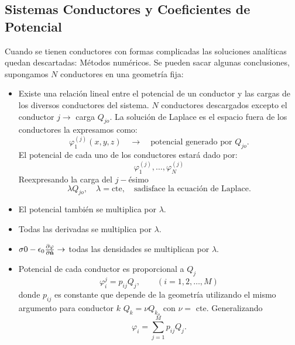 \subsection{Sistemas Conductores y Coeficientes de Potencial}
Cuando se tienen conductores con formas complicadas las soluciones analíticas quedan descartadas: Métodos numéricos. Se pueden sacar algunas conclusiones, supongamos $N$ conductores en una geometría fija:
\begin{itemize}
	\item Existe una relación lineal entre el potencial de un conductor y las cargas de los diversos conductores del sistema. $N$ conductores descargados excepto el conductor $j\to$ carga $Q_{jo}$. La solución de Laplace es el espacio fuera de los conductores la expresamos como:
	\begin{equation}
		\varphi _1 ^{(j)} (x,y,z) \quad \to \quad \text{potencial generado por } Q_{jo}.
	\end{equation}
	El potencial de cada uno de los conductores estará dado por:
	\begin{equation}
		\varphi _1 ^{(j)}, \ldots, \varphi _N ^{(j)}
	\end{equation}
	Reexpresando la carga del $j-$ésimo
	$$ \lambda Q_{jo}, \quad \lambda = \text{cte}, \quad \text{sadisface la ecuación de Laplace.} $$
	\item El potencial también se multiplica por $\lambda $.
	\item Todas las derivadas se multiplica por $\lambda$.
	\item $\sigma 0 -\epsilon_0 \pdv{\varphi}{\vu{n}} \to$ todas las densidades se multiplican por $\lambda$.
	\item Potencial de cada conductor es proporcional a $Q_j$
	\begin{equation}
		\varphi _i ^j = p_{ij} Q_j, \qquad (i = 1,2,\ldots ,M)
	\end{equation}
	donde $p_{ij}$ es constante que depende de la geometría utilizando el mismo argumento para conductor $k$ $Q_k = \nu Q_{k_o}$ con $\nu =$ cte. Generalizando
	\begin{equation}
		\varphi _i = \sum _{j=1} ^{M} p_{ij} Q_j.
	\end{equation}
\end{itemize}









